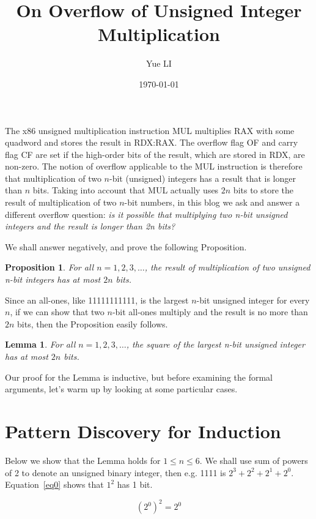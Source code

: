 \documentclass{article}
\title{On Overflow of Unsigned Integer Multiplication}
\author{Yue LI}
\date{\today}
\newtheorem*{proposition}{Proposition}
\newtheorem*{lemma}{Lemma}
\begin{document}
\maketitle
The x86 unsigned multiplication instruction MUL multiplies RAX with some quadword and stores the result in RDX:RAX.  The overflow flag OF and carry flag CF are set if the high-order bits of the result, which are stored in RDX, are non-zero. The notion of overflow applicable to the MUL instruction is therefore that multiplication of two $n$-bit (unsigned) integers has a result that is longer than $n$ bits. Taking into account that MUL actually uses $2n$ bits to store the result of multiplication of two $n$-bit numbers, in this blog we ask and answer a different overflow question: \emph{is it possible that multiplying two n-bit unsigned integers and the result is longer than 2n bits?}

We shall answer negatively, and prove the following Proposition.

\begin{proposition}
  For all $n=1,2,3,\ldots$, the result of multiplication of two unsigned n-bit integers has at most $2n$ bits.
\end{proposition}

Since an all-ones, like 11111111111, is the largest $n$-bit unsigned integer for every $n$, if we can show that two $n$-bit all-ones multiply and the result is no more than $2n$ bits, then the Proposition easily follows. 

\begin{lemma}
  For all $n=1,2,3,\ldots$, the square of the largest n-bit unsigned integer has at most $2n$ bits.
\end{lemma}

Our proof for the Lemma is inductive, but before examining the formal arguments, let's warm up by looking at some particular cases.

\section{Pattern Discovery for Induction}

Below we show that the Lemma holds for $1\leq n\leq 6$. We shall use sum of powers of 2 to denote an unsigned binary integer, then e.g. 1111 is $2^3+2^2+2^1+2^0$. Equation~\ref{eq0} shows that $1^2$ has 1 bit.

\begin{equation} \label{eq0}
(2^0)^2=2^0
\end{equation}
\end{document}
